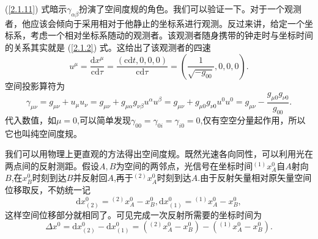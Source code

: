 \documentclass[11pt, a4paper, oneside, onecolumn]{ctexart}
\numberwithin{equation}{subsection}
\begin{document}
(\ref{2.1.11}) 式暗示$\gamma_{\alpha\beta}$扮演了空间度规的角色。我们可以验证一下。对于一个观测者，他应该会倾向于采用相对于他静止的坐标系进行观测。反过来讲，给定一个坐标系，考虑一个相对坐标系随动的观测者。该观测者随身携带的钟走时与坐标时间的关系其实就是 (\ref{2.1.2}) 式。这给出了该观测者的四速
\begin{equation}
u^{\mu}=\frac{\mathrm{d}x^{\mu}}{\mathrm{c}\mathrm{d}\tau}=\frac{\left(\mathrm{c}\mathrm{d}t,0,0,0\right)}{\mathrm{c}\mathrm{d}\tau}=\left(\frac{1}{\sqrt{-g_{00}}},0,0,0\right).
\end{equation}
空间投影算符为
\begin{equation}
\gamma_{\mu\nu}=g_{\mu\nu}+u_{\mu}u_{\nu}=g_{\mu\nu}+g_{\mu\alpha}g_{\nu\beta}u^{\alpha}u^{\beta}=g_{\mu\nu}+g_{\mu0}g_{\nu0}u^{0}u^{0}=g_{\mu\nu}-\frac{g_{\mu0}g_{\nu0}}{g_{00}}.
\end{equation}
代入数值，如$\mu=0$,可以简单发现$\gamma_{00}=\gamma_{0i}=\gamma_{i0}=0$,仅有空空分量起作用，所以它也叫纯空间度规。

我们可以用物理上更直观的方法得出空间度规。既然光速各向同性，可以利用光在两点间的反射测距。假设$A,B$为空间的两邻点，光信号在坐标时间${}^{\left(1\right)}x_{A}^{0}$自$A$射向$B$,在$x_{B}^{0}$时刻到达$B$并反射回$A$,再于${}^{\left(2\right)}x_{A}^{0}$时刻到达$A$.由于反射矢量相对原矢量空间位移取反，不妨统一记
\begin{equation}
\mathrm{d}x^{0}_{\left(2\right)}={}^{\left(2\right)}x_{A}^{0}-x_{B}^{0},\mathrm{d}x^{0}_{\left(1\right)}={}^{\left(1\right)}x_{A}^{0}-x_{B}^{0},
\end{equation}
这样空间位移部分就相同了。可见完成一次反射所需要的坐标时间为
\begin{equation}
\Delta{}x^{0}=\mathrm{d}x^{0}_{\left(2\right)}-\mathrm{d}x^{0}_{\left(1\right)}=\left({}^{\left(2\right)}x_{A}^{0}-x^{0}_{B}\right)-\left({}^{\left(1\right)}x_{A}^{0}-x^{0}_{B}\right).
\end{equation}
\end{document}
